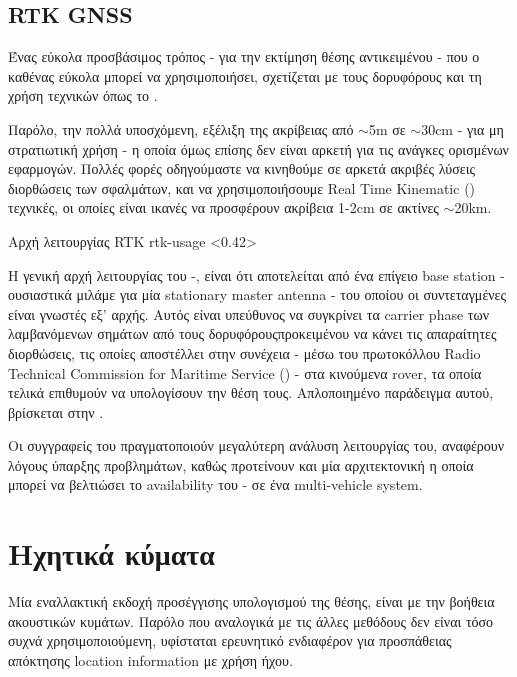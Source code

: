 \subsection{RTK GNSS}
Ένας εύκολα προσβάσιμος τρόπος - για την εκτίμηση θέσης αντικειμένου - που ο καθένας εύκολα μπορεί να χρησιμοποιήσει, σχετίζεται με τους δορυφόρους και τη χρήση  τεχνικών όπως το .

Παρόλο, την πολλά υποσχόμενη, εξέλιξη της ακρίβειας από $\sim$5m \cite{gps-accuracy}
σε $\sim$30cm \cite{superaccurate-gps} - για μη στρατιωτική χρήση -
η οποία όμως επίσης δεν είναι αρκετή για τις ανάγκες ορισμένων εφαρμογών. 
Πολλές φορές οδηγούμαστε να κινηθούμε σε αρκετά ακριβές 
λύσεις διορθώσεις των σφαλμάτων, και να χρησιμοποιήσουμε  Real Time Kinematic () \cite{rtk-gps} τεχνικές, οι οποίες είναι ικανές να προσφέρουν ακρίβεια 1-2cm σε ακτίνες $\sim$20km. 

%
{Αρχή λειτουργίας RTK}%
{rtk-usage}%
<0.42>%

Η γενική αρχή λειτουργίας του -, είναι ότι αποτελείται από ένα επίγειο
base station - ουσιαστικά μιλάμε για μία stationary  master antenna - του οποίου οι
συντεταγμένες είναι γνωστές εξ' αρχής. Αυτός είναι υπεύθυνος να συ\-γκρί\-νει τα carrier phase των λαμβανόμενων σημάτων από τους δορυφόρους\udot προκειμένου να κάνει τις απαραίτητες διορθώσεις, τις
οποίες αποστέλλει στην συνέχεια - μέσω του πρωτοκόλλου Radio Technical Commission for Maritime Service
() - στα κινούμενα rover, τα οποία τελικά επιθυμούν να υπολογίσουν την θέση τους. Απλοποιημένο παράδειγμα αυτού, βρίσκεται στην .

Οι συγγραφείς του \cite{rtk-gps-drone-localization} πραγματοποιούν μεγαλύτερη ανάλυση λει\-του\-ργίας του, α\-να\-φέ\-ρουν λόγους ύπαρξης προβλημάτων, καθώς προτείνουν και μία αρχιτεκτονική η οποία μπορεί να βελτιώσει το availability του - σε ένα multi-vehicle system.

\section{Ηχητικά κύματα} \label{sec:related-sound}
Μία εναλλακτική εκδοχή προσέγγισης υπολογισμού της θέσης, είναι με την βοήθεια ακουστικών κυμάτων. Παρόλο που αναλογικά με τις άλλες μεθόδους δεν είναι τόσο συχνά χρησιμοποιούμενη, υφίσταται ερευνητικό ενδιαφέρον για προσπάθειας α\-πό\-κτη\-σης location information με χρήση ήχου. 

